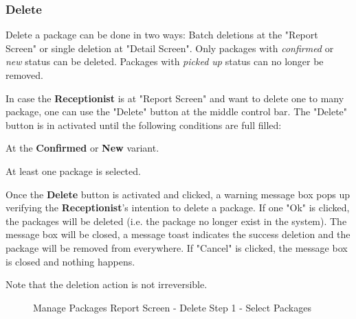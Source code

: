 \subsubsection{Delete}

Delete a package can be done in two ways: Batch deletions at the "Report Screen" or single deletion at "Detail Screen". Only packages with \textit{confirmed} or \textit{new} status can be deleted. Packages with \textit{picked up} status can no longer be removed.

In case the \textbf{Receptionist} is at "Report Screen" and want to delete one to many package, one can use the "Delete" button at the middle control bar. The "Delete" button is in activated until the following conditions are full filled:

\begin{compactenum}
    \item At the \textbf{Confirmed} or \textbf{New} variant.
    \item At least one package is selected.
\end{compactenum}

Once the \textbf{Delete} button is activated and clicked, a warning message box pops up verifying the \textbf{Receptionist}'s intention to delete a package. If one "Ok" is clicked, the packages will be deleted (i.e. the package no longer exist in the system). The message box will be closed, a message toast indicates the success deletion and the package will be removed from everywhere. If "Cancel" is clicked, the message box is closed and nothing happens.

Note that the deletion action is not irreversible.

\begin{figure}[H]
	\centering

    \caption{Manage Packages Report Screen - Delete Step 1 - Select Packages}
	\label{fig:MPReportDeleteBtn}
\end{figure}


